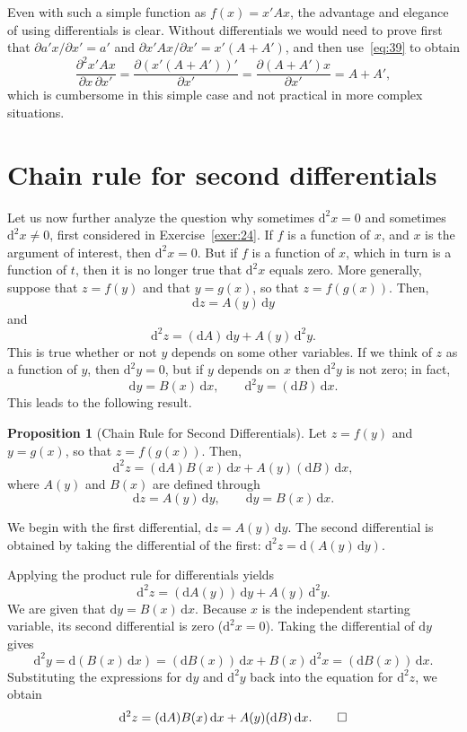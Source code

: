 \documentclass[12pt,a4paper]{article}
\makeatletter
\theoremstyle{definition}
\newtheorem{proposition}{Proposition}
\renewenvironment{proof}[1][\proofname]{\par
  \pushQED{\qed}%
  \normalfont \topsep6\p@\@plus6\p@\relax
  \trivlist
  \item[\hskip\labelsep\bfseries #1\@addpunct{.}]\ignorespaces
}{%
  \popQED\endtrivlist\@endpefalse
}
\newcommand{\dd}{\mathrm{d}}
\makeatother
\begin{document}
Even with such a simple function as $f(x) = x'Ax$, the advantage and elegance of using differentials is clear. Without differentials we would need to prove first that $\partial a'x/\partial x' = a'$ and $\partial x'Ax/\partial x' = x'(A + A')$, and then use~\eqref{eq:39} to obtain
\[
\frac{\partial^2 x'Ax}{\partial x\, \partial x'} = \frac{\partial (x'(A + A'))'}{\partial x'} = \frac{\partial (A + A')x}{\partial x'} = A + A',
\]
which is cumbersome in this simple case and not practical in more complex situations. %

\section{Chain rule for second differentials}\label{sec:10}

Let us now further analyze the question why sometimes $\dd^2 x = 0$ and sometimes $\dd^2 x \neq 0$, first considered in Exercise~\ref{exer:24}. If $f$ is a function of $x$, and $x$ is the argument of interest, then $\dd^2 x = 0$. But if $f$ is a function of $x$, which in turn is a function of $t$, then it is no longer true that $\dd^2 x$ equals zero. %
More generally, suppose that $z = f(y)$ and that $y = g(x)$, so that $z = f(g(x))$. Then,
\[
\dd z = A(y)\, \dd y
\]
and
\begin{equation}\label{eq:41}
\dd^2 z = (\dd A)\, \dd y + A(y)\, \dd^2 y.
\end{equation}
This is true whether or not $y$ depends on some other variables. If we think of $z$ as a function of $y$, then $\dd^2 y = 0$, but if $y$ depends on $x$ then $\dd^2 y$ is not zero; in fact,
\[
\dd y = B(x)\, \dd x, \qquad \dd^2 y = (\dd B)\, \dd x.
\]
This leads to the following result. %

\begin{proposition}[Chain Rule for Second Differentials]\label{prp:14}
Let $z = f(y)$ and $y = g(x)$, so that $z = f(g(x))$. Then,
\[
\dd^2 z = (\dd A) B(x)\, \dd x + A(y)(\dd B)\, \dd x,
\]
where $A(y)$ and $B(x)$ are defined through
\[
\dd z = A(y)\, \dd y, \qquad \dd y = B(x)\, \dd x.
\]
\end{proposition}

\begin{proof}
We begin with the first differential, $\dd z = A(y)\, \dd y$. The second differential is obtained by taking the differential of the first: $\dd^2 z = \dd(A(y)\, \dd y)$. 

Applying the product rule for differentials yields
\[
\dd^2 z = (\dd A(y))\, \dd y + A(y)\, \dd^2 y.
\]
We are given that $\dd y = B(x)\, \dd x$. Because $x$ is the independent starting variable, its second differential is zero ($\dd^2 x = 0$). Taking the differential of $\dd y$ gives
\[
\dd^2 y = \dd(B(x)\, \dd x) = (\dd B(x))\, \dd x + B(x)\, \dd^2 x = (\dd B(x))\, \dd x.
\]
Substituting the expressions for $\dd y$ and $\dd^2 y$ back into the equation for $\dd^2 z$, we obtain
\[
\dd^2 z = (\dd A) B(x)\, \dd x + A(y)(\dd B)\, \dd x. \qedhere
\]
\end{proof}
\end{document}
